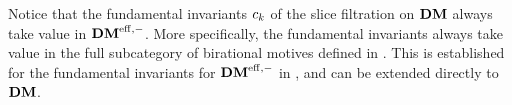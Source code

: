 \begin{rmk}
Notice that the fundamental invariants $c_{k}$ of the slice 
filtration on $\mathbf{DM}$ always take value in $\mathbf{DM}^{\mathrm{eff},-}$. More 
specifically, the fundamental invariants always take value in the 
full subcategory of birational motives defined in \cite{KaSu}. 
This is established for the fundamental invariants for $\mathbf{DM}^{\mathrm{eff},-}$ 
in \cite[Section 2]{HuKa}, and can be extended directly to $\mathbf{DM}$.
\end{rmk}

